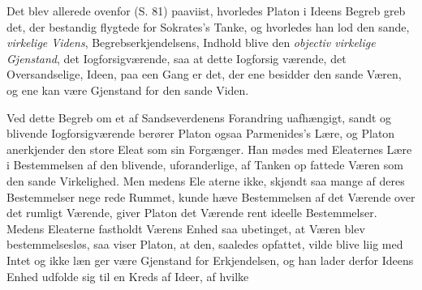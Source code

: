 \documentclass[12pt,a4paper]{book}
\newcommand{\divrule}{\begin{center}\rule{2cm}{0.4pt}\end{center}}
\begin{document}
Det blev allerede ovenfor (S. 81) paaviist, hvorledes Platon
i Ideens Begreb greb det, der bestandig flygtede for Sokrates's
Tanke, og hvorledes han lod den sande, \emph{virkelige Videns},
Begrebserkjendelsens, Indhold blive den \emph{objectiv virkelige
Gjenstand}, det Iogforsigværende, saa at dette Iogforsig\-%
værende, det Oversandselige, Ideen, paa een Gang er det, der
ene besidder den sande Væren, og ene kan være Gjenstand
for den sande Viden.

Ved dette Begreb om et af Sandseverdenens Forandring
uafhængigt, sandt og blivende Iogforsigværende berører Platon
ogsaa Parmenides's Lære, og Platon anerkjender den store
Eleat som sin Forgænger. Han mødes med Eleaternes Lære
i Bestemmelsen af den blivende, uforanderlige, af Tanken op\-%
fattede Væren som den sande Virkelighed. Men medens Ele\-%
aterne ikke, skjøndt saa mange af deres Bestemmelser nege\-%
rede Rummet, kunde hæve Bestemmelsen af det Værende over
det rumligt Værende, giver Platon det Værende rent ideelle
Bestemmelser. Medens Eleaterne fastholdt Værens Enhed saa
ubetinget, at Væren blev bestemmelsesløs, saa viser Platon, at
den, saaledes opfattet, vilde blive liig med Intet og ikke læn\-%
ger være Gjenstand for Erkjendelsen, og han lader derfor
Ideens Enhed udfolde sig til en Kreds af Ideer, af hvilke
\end{document}
